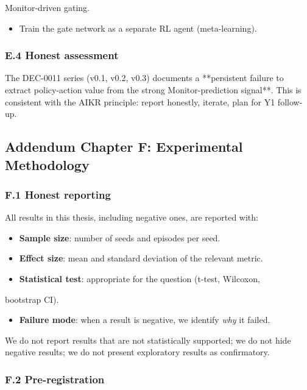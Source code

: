 \documentclass[11pt]{article}
\begin{document}
    Monitor-driven gating.
\begin{itemize}
  \item Train the gate network as a separate RL agent (meta-learning).
\end{itemize}


\subsubsection{E.4 Honest assessment}

The DEC-0011 series (v0.1, v0.2, v0.3) documents a **persistent failure
to extract policy-action value from the strong Monitor-prediction signal**.
This is consistent with the AIKR principle: report honestly, iterate,
plan for Y1 follow-up.

\hrulefill

\subsection{Addendum Chapter F: Experimental Methodology}

\subsubsection{F.1 Honest reporting}

All results in this thesis, including negative ones, are reported with:

\begin{itemize}
  \item \textbf{Sample size}: number of seeds and episodes per seed.
  \item \textbf{Effect size}: mean and standard deviation of the relevant metric.
  \item \textbf{Statistical test}: appropriate for the question (t-test, Wilcoxon,
\end{itemize}

  bootstrap CI).
\begin{itemize}
  \item \textbf{Failure mode}: when a result is negative, we identify \textit{why} it failed.
\end{itemize}


We do not report results that are not statistically supported; we do
not hide negative results; we do not present exploratory results as
confirmatory.

\subsubsection{F.2 Pre-registration}
\end{document}
